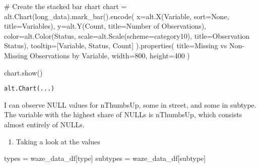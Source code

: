 \documentclass[
  letterpaper,
  DIV=11,
  numbers=noendperiod]{scrartcl}
\newenvironment{Shaded}{\begin{snugshade}}{\end{snugshade}}
\newcommand{\CommentTok}[1]{\textcolor[rgb]{0.37,0.37,0.37}{#1}}
\newcommand{\DecValTok}[1]{\textcolor[rgb]{0.68,0.00,0.00}{#1}}
\newcommand{\NormalTok}[1]{\textcolor[rgb]{0.00,0.23,0.31}{#1}}
\newcommand{\OperatorTok}[1]{\textcolor[rgb]{0.37,0.37,0.37}{#1}}
\newcommand{\StringTok}[1]{\textcolor[rgb]{0.13,0.47,0.30}{#1}}
\newcommand{\VariableTok}[1]{\textcolor[rgb]{0.07,0.07,0.07}{#1}}
\providecommand{\tightlist}{%
  \setlength{\itemsep}{0pt}\setlength{\parskip}{0pt}}\usepackage{longtable,booktabs,array}
\begin{document}
\begin{Shaded}
\begin{Highlighting}[]
\CommentTok{\# Create the stacked bar chart}
\NormalTok{chart }\OperatorTok{=}\NormalTok{ alt.Chart(long\_data).mark\_bar().encode(}
\NormalTok{    x}\OperatorTok{=}\NormalTok{alt.X(}\StringTok{\textquotesingle{}Variable\textquotesingle{}}\NormalTok{, sort}\OperatorTok{=}\VariableTok{None}\NormalTok{, title}\OperatorTok{=}\StringTok{\textquotesingle{}Variables\textquotesingle{}}\NormalTok{),}
\NormalTok{    y}\OperatorTok{=}\NormalTok{alt.Y(}\StringTok{\textquotesingle{}Count\textquotesingle{}}\NormalTok{, title}\OperatorTok{=}\StringTok{\textquotesingle{}Number of Observations\textquotesingle{}}\NormalTok{),}
\NormalTok{    color}\OperatorTok{=}\NormalTok{alt.Color(}\StringTok{\textquotesingle{}Status\textquotesingle{}}\NormalTok{, scale}\OperatorTok{=}\NormalTok{alt.Scale(scheme}\OperatorTok{=}\StringTok{\textquotesingle{}category10\textquotesingle{}}\NormalTok{), title}\OperatorTok{=}\StringTok{\textquotesingle{}Observation Status\textquotesingle{}}\NormalTok{),}
\NormalTok{    tooltip}\OperatorTok{=}\NormalTok{[}\StringTok{\textquotesingle{}Variable\textquotesingle{}}\NormalTok{, }\StringTok{\textquotesingle{}Status\textquotesingle{}}\NormalTok{, }\StringTok{\textquotesingle{}Count\textquotesingle{}}\NormalTok{]}
\NormalTok{).properties(}
\NormalTok{    title}\OperatorTok{=}\StringTok{\textquotesingle{}Missing vs Non{-}Missing Observations by Variable\textquotesingle{}}\NormalTok{,}
\NormalTok{    width}\OperatorTok{=}\DecValTok{800}\NormalTok{,}
\NormalTok{    height}\OperatorTok{=}\DecValTok{400}
\NormalTok{)}

\NormalTok{chart.show()}
\end{Highlighting}
\end{Shaded}

\begin{verbatim}
alt.Chart(...)
\end{verbatim}

I can observe NULL values for nThumbsUp, some in street, and some in
subtype. The variable with the highest share of NULLs is nThumbsUp,
which consists almost entirely of NULLs.

\begin{enumerate}
\def\labelenumi{\arabic{enumi}.}
\setcounter{enumi}{2}
\tightlist
\item
  Taking a look at the values
\end{enumerate}

\begin{Shaded}
\begin{Highlighting}[]
\NormalTok{types }\OperatorTok{=}\NormalTok{ waze\_data\_df[}\StringTok{\textquotesingle{}type\textquotesingle{}}\NormalTok{]}
\NormalTok{subtypes }\OperatorTok{=}\NormalTok{ waze\_data\_df[}\StringTok{\textquotesingle{}subtype\textquotesingle{}}\NormalTok{]}
\end{Highlighting}
\end{Shaded}
\end{document}
